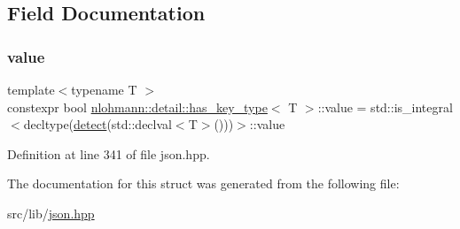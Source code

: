 \subsection{Field Documentation}
\mbox{\label{structnlohmann_1_1detail_1_1has__key__type_a10b4ec56e7a38d678615d95278f6d36f}} 
\subsubsection{\texorpdfstring{value}{value}}
{\footnotesize\ttfamily template$<$typename T $>$ \\
constexpr bool \hyperlink{structnlohmann_1_1detail_1_1has__key__type}{nlohmann\+::detail\+::has\+\_\+key\+\_\+type}$<$ T $>$\+::value = std\+::is\+\_\+integral$<$decltype(\hyperlink{structnlohmann_1_1detail_1_1has__key__type_a8387ce16ab3d7c83665265e5d244ccca}{detect}(std\+::declval$<$T$>$()))$>$\+::value\hspace{0.3cm}{\ttfamily [static]}}



Definition at line 341 of file json.\+hpp.



The documentation for this struct was generated from the following file\+:\begin{DoxyCompactItemize}
\item 
src/lib/\hyperlink{json_8hpp}{json.\+hpp}\end{DoxyCompactItemize}
